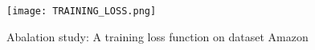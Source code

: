 \documentclass[acmsmall]{acmart}
\begin{document}
\begin{figure}
    \centering
    \texttt{[image: TRAINING\_LOSS.png]}
    \caption{Abalation study: A training loss function on dataset Amazon}
    \label{fig:enter-label}
\end{figure}
\end{document}

